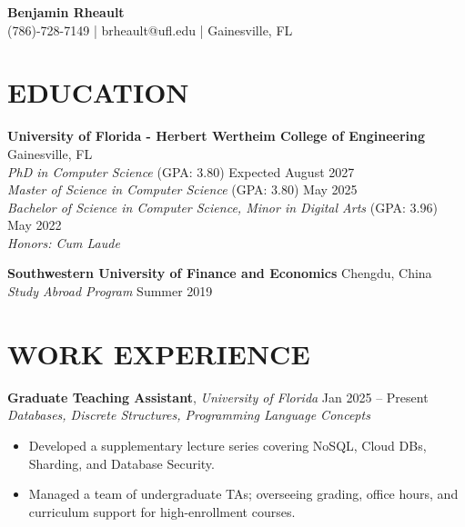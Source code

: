 \documentclass[10pt, letterpaper]{article}
\begin{document}
\begin{center}
    {\huge \textbf{Benjamin Rheault}} \\
    \vspace{2pt}
    (786)-728-7149 | {brheault@ufl.edu} | Gainesville, FL
\end{center}

\section{EDUCATION}
\noindent \textbf{University of Florida - Herbert Wertheim College of Engineering} \hfill Gainesville, FL \\
\noindent \textit{PhD in Computer Science} (GPA: 3.80) \hfill Expected August 2027 \\
\noindent \textit{Master of Science in Computer Science} (GPA: 3.80) \hfill May 2025 \\
\noindent \textit{Bachelor of Science in Computer Science, Minor in Digital Arts} (GPA: 3.96) \hfill May 2022 \\
\noindent \textbullet{} \textit{Honors: Cum Laude}

\vspace{4pt}
\noindent \textbf{Southwestern University of Finance and Economics} \hfill Chengdu, China \\
\textit{Study Abroad Program} \hfill Summer 2019

\section{WORK EXPERIENCE}
\noindent \textbf{Graduate Teaching Assistant}, \textit{University of Florida} \hfill Jan 2025 -- Present \\
\textit{Databases, Discrete Structures, Programming Language Concepts}
\begin{itemize}
    \item Developed a supplementary lecture series covering NoSQL, Cloud DBs, Sharding, and Database Security.
    \item Managed a team of undergraduate TAs; overseeing grading, office hours, and curriculum support for high-enrollment courses.
\end{itemize}

\vspace{0.2cm}
\end{document}
